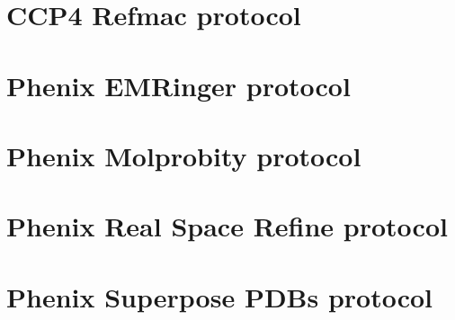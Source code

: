 \documentclass[12pt]{article} %
\begin{document}
\tableofcontents %

\newpage %





















\begin{appendices}






\section{CCP4 Refmac protocol}
\label{app:ccp4Refmac}%







\section{Phenix EMRinger protocol}
\label{app:emRingerProtocol}%

\section{Phenix Molprobity protocol}
\label{app:molprobityProtocol}%

\section{Phenix Real Space Refine protocol}
\label{app:realSpaceRefineProtocol}%

\section{Phenix Superpose PDBs protocol}
\label{app:superposePdbsProtocol}%











\end{appendices}
\end{document}
